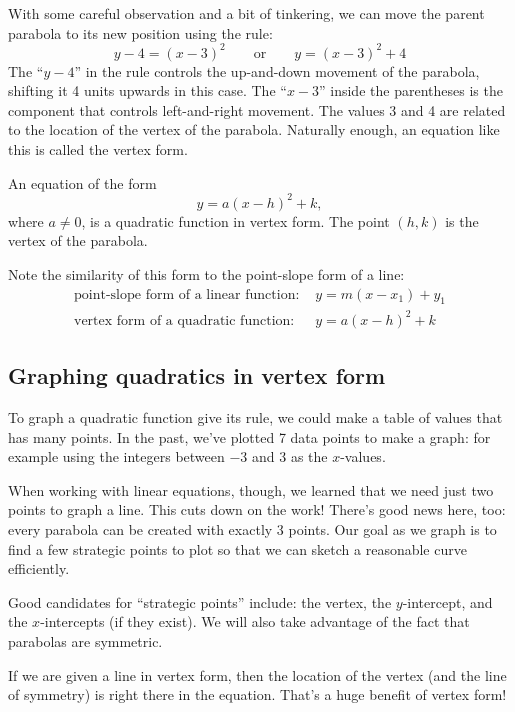 With some careful observation and a bit of tinkering, we can move the parent parabola to its new position using the rule:
\[y-4=(x-3)^2 \qquad\text{or}\qquad y = (x-3)^2+4\]
The ``$y-4$'' in the rule controls the up-and-down movement of the parabola, shifting it 4 units upwards in this case. The ``$x-3$'' inside the parentheses is the component that controls left-and-right movement. The values 3 and 4 are related to the location of the vertex of the parabola. Naturally enough, an equation like this is called the \gls{vertex form}.

\begin{boxeddef}
An equation of the form \[y = a(x-h)^2 + k,\] where $a\neq0$, is a quadratic function in vertex form. The point $(h,k)$ is the vertex of the parabola.
\end{boxeddef}

Note the similarity of this form to the point-slope form of a line:
\[\begin{array}{rl}
\text{point-slope form of a linear function: } & y = m(x-x_1) + y_1\\
\text{vertex form of a quadratic function: } & y = a(x-h)^2 + k
\end{array}\]


\subsection{Graphing quadratics in vertex form}

To graph a quadratic function give its rule, we could make a table of values that has many points. In the past, we've plotted 7 data points to make a graph: for example using the integers between $-3$ and 3 as the $x$-values.

When working with linear equations, though, we learned that we need just two points to graph a line. This cuts down on the work! There's good news here, too: every parabola can be created with exactly 3 points. Our goal as we graph is to find a few strategic points to plot so that we can sketch a reasonable curve efficiently.

Good candidates for ``strategic points'' include: the vertex, the $y$-intercept, and the $x$-intercepts (if they exist). We will also take advantage of the fact that parabolas are symmetric.

If we are given a line in vertex form, then the location of the vertex (and the line of
symmetry) is right there in the equation. That's a huge benefit of vertex form!

